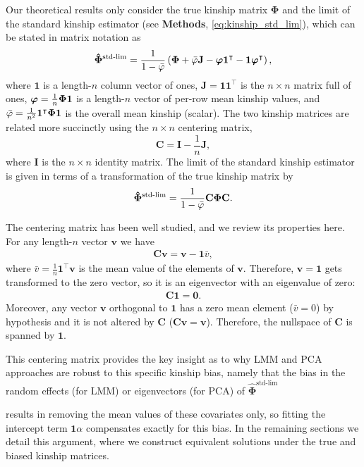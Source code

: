 \documentclass[11pt]{article}
\newcommand{\kinMat}{%
  \ensuremath{%
    \mathbf{\Phi}
  }%
  \xspace%
}%
\newcommand{\kinMatEstNamed}[1]{%
  \ensuremath{%
    \mathbf{\hat{\Phi}}^\text{#1}
  }%
  \xspace%
}%
\newcommand{\kinMatStdLim}{%
  \kinMatEstNamed{std-lim}
}%
\begin{document}
Our theoretical results only consider the true kinship matrix \kinMat and the limit of the standard kinship estimator (see \textbf{Methods}, \cref{eq:kinship_std_lim}), which can be stated in matrix notation as
$$
\kinMatStdLim
=
\frac{1}{1 - \bar{\varphi}}
\left(
  \kinMat
  + \bar{\varphi} \mathbf{J}
  - \boldsymbol{\varphi} \mathbf{1}^\intercal 
  - \mathbf{1} \boldsymbol{\varphi}^\intercal 
\right)
,
$$
where
$\mathbf{1}$ is a length-$n$ column vector of ones,
$\mathbf{J} = \mathbf{1} \mathbf{1}^\intercal$ is the $n \times n$ matrix full of ones,
$\boldsymbol{\varphi} = \frac{1}{n} \kinMat \mathbf{1}$ is a length-$n$ vector of per-row mean kinship values, and
$\bar{\varphi} = \frac{1}{n^2} \mathbf{1}^\intercal \kinMat \mathbf{1}$ is the overall mean kinship (scalar).
The two kinship matrices are related more succinctly using the $n \times n$ centering matrix,
$$
\mathbf{C}
=
\mathbf{I} - \frac{1}{n} \mathbf{J},
$$
where $\mathbf{I}$ is the $n \times n$ identity matrix.
The limit of the standard kinship estimator is given in terms of a transformation of the true kinship matrix by
\begin{equation}
  \label{eq:kin-std-lim-C}
  \kinMatStdLim
  =
  \frac{1}{1 - \bar{\varphi}}
  \mathbf{C} \kinMat \mathbf{C}
  .
\end{equation}

The centering matrix has been well studied, and we review its properties here.
For any length-$n$ vector $\mathbf{v}$ we have
\begin{align*}
  \mathbf{C} \mathbf{v}
  =
  \mathbf{v} - \mathbf{1} \bar{v}
  ,
\end{align*}
where $\bar{v} = \frac{1}{n} \mathbf{1}^\intercal \mathbf{v}$ is the mean value of the elements of $\mathbf{v}$.
Therefore, $\mathbf{v} = \mathbf{1}$ gets transformed to the zero vector, so it is an eigenvector with an eigenvalue of zero:
\begin{align*}
  \mathbf{C} \mathbf{1}
  =
  \mathbf{0}
  .
\end{align*}
Moreover, any vector $\mathbf{v}$ orthogonal to $\mathbf{1}$ has a zero mean element ($\bar{v} = 0$) by hypothesis and it is not altered by $\mathbf{C}$ ($\mathbf{C} \mathbf{v} = \mathbf{v}$).
Therefore, the nullspace of $\mathbf{C}$ is spanned by $\mathbf{1}$.

This centering matrix provides the key insight as to why LMM and PCA approaches are robust to this specific kinship bias, namely that the bias in the random effects (for LMM) or eigenvectors (for PCA) of \kinMatStdLim results in removing the mean values of these covariates only, so fitting the intercept term $\mathbf{1} \alpha$ compensates exactly for this bias.
In the remaining sections we detail this argument, where we construct equivalent solutions under the true and biased kinship matrices.
\end{document}
